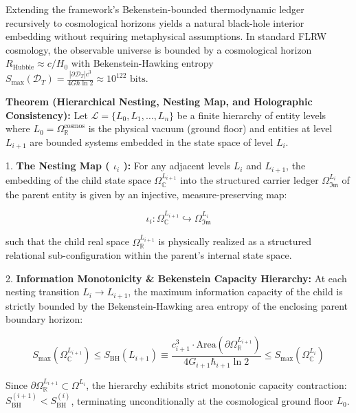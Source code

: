 \documentclass[11pt,a4paper]{article}
\theoremstyle{definition}
\theoremstyle{remark}
\begin{document}
Extending the framework's Bekenstein-bounded thermodynamic ledger recursively to cosmological horizons yields a natural black-hole interior embedding without requiring metaphysical assumptions. In standard FLRW cosmology, the observable universe is bounded by a cosmological horizon $R_{\text{Hubble}} \approx c/H_0$ with Bekenstein-Hawking entropy $S_{\text{max}}(\mathcal{D}_T) = \frac{|\partial \mathcal{D}_T| c^3}{4 G \hbar \ln 2} \approx 10^{122} \text{ bits}$.

\textbf{Theorem (Hierarchical Nesting, Nesting Map, and Holographic Consistency):} Let $\mathcal{L} = \{L_0, L_1, \ldots, L_n\}$ be a finite hierarchy of entity levels where $L_0 = \Omega_\mathbb{R}^{\text{cosmos}}$ is the physical vacuum (ground floor) and entities at level $L_{i+1}$ are bounded systems embedded in the state space of level $L_i$.

1. \textbf{The Nesting Map ( $\iota_i$ ):}
For any adjacent levels $L_i$ and $L_{i+1}$, the embedding of the child state space $\Omega_\mathbb{C}^{L_{i+1}}$ into the structured carrier ledger $\Omega_{\mathfrak{Im}}^{L_i}$ of the parent entity is given by an injective, measure-preserving map:


\begin{equation}
\boxed{\iota_i: \Omega_\mathbb{C}^{L_{i+1}} \hookrightarrow \Omega_{\mathfrak{Im}}^{L_i}}
\end{equation}


such that the child real space $\Omega_\mathbb{R}^{L_{i+1}}$ is physically realized as a structured relational sub-configuration within the parent's internal state space.

2. \textbf{Information Monotonicity \& Bekenstein Capacity Hierarchy:}
At each nesting transition $L_i \to L_{i+1}$, the maximum information capacity of the child is strictly bounded by the Bekenstein-Hawking area entropy of the enclosing parent boundary horizon:


\begin{equation}
\boxed{S_{\text{max}}(\Omega_\mathbb{C}^{L_{i+1}}) \le S_{\text{BH}}(L_{i+1}) \equiv \frac{c_{i+1}^3 \cdot \mathrm{Area}(\partial \Omega_\mathbb{R}^{L_{i+1}})}{4 G_{i+1} \hbar_{i+1} \ln 2} \le S_{\text{max}}(\Omega_\mathbb{C}^{L_i})}
\end{equation}


Since $\partial \Omega_\mathbb{R}^{L_{i+1}} \subset \Omega^{L_i}$, the hierarchy exhibits strict monotonic capacity contraction: $S_{\text{BH}}^{(i+1)} < S_{\text{BH}}^{(i)}$, terminating unconditionally at the cosmological ground floor $L_0$.
\end{document}
